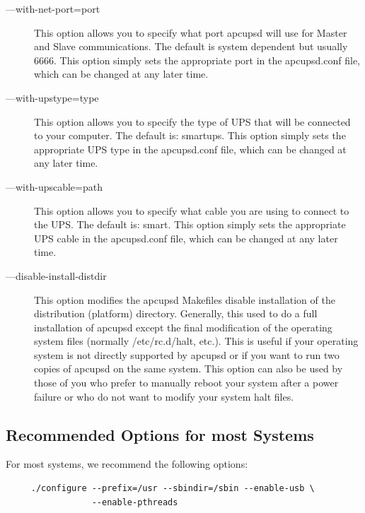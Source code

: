 \begin{description}
\item [{---}with-net-port=\lt{}port\gt{}]
   This option allows you to specify what port apcupsd will use for Master and
Slave communications. The default is system dependent but usually 6666. This
option simply sets the appropriate port in the apcupsd.conf file, which can be
changed at any later time.  

\item [{---}with-upstype=\lt{}type\gt{}]
   This option allows you to specify the type of UPS that will be connected to
your computer. The default is: smartups. This option simply sets the
appropriate UPS type in the apcupsd.conf file, which can be changed at any
later time.  

\item [{---}with-upscable=\lt{}path\gt{}]
   This option allows you to specify what cable you are using to connect to the
UPS. The default is: smart. This option simply sets the appropriate UPS cable
in the apcupsd.conf file, which can be changed at any later time.  

\item [{---}disable-install-distdir]
   This option modifies the apcupsd Makefiles disable installation of the
distribution (platform) directory. Generally, this used to do a full
installation of apcupsd except the final modification of the operating system
files (normally /etc/rc.d/halt, etc.). This is useful if your operating system
is not directly supported by apcupsd or if you want to run two copies of
apcupsd on the same system. This option can also be used by those of you who
prefer to manually reboot your system after a power failure or who do not want
to modify your system halt files. 
\end{description}

\label{Recommended-Options-for-most-Systems}

\subsection*{Recommended Options for most Systems}

For most systems, we recommend the following options: 

\footnotesize
\begin{verbatim}
     ./configure --prefix=/usr --sbindir=/sbin --enable-usb \
                 --enable-pthreads
\end{verbatim}
\normalsize

